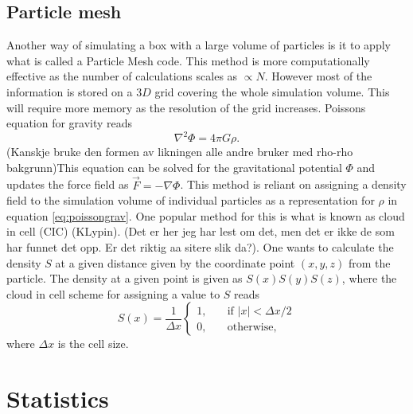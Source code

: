 \subsection{Particle mesh}
Another way of simulating a box with a large volume of particles is it to apply
what is called a Particle Mesh code. This method is more computationally
effective as the number of calculations scales as $\propto N$. However most of
the information is stored on a $3D$ grid covering the whole simulation volume.
This will require more memory as the resolution of the grid increases. Poissons equation for gravity reads
\begin{equation}\label{eq:poissongrav}
    \nabla^2\Phi=4\pi G\rho.
\end{equation}
(Kanskje bruke den formen av likningen alle andre bruker med rho-rho bakgrunn)This equation can be solved for the gravitational potential $\Phi$ and updates
the force field as $\vec{F}=-\nabla\Phi$. This method is reliant on assigning a
density field to the simulation volume of individual particles as a
representation for $\rho$ in equation \ref{eq:poissongrav}. One popular method 
for this is what is known as cloud in cell (CIC) (KLypin). (Det
er her jeg har lest om det, men det er ikke de som har funnet det opp. Er det
riktig aa sitere slik da?). One wants to calculate the density $S$ at a given
distance given by the coordinate point $(x,y,z)$ from the particle. The density at a given point is given as
$S(x)S(y)S(z)$, where the cloud in cell scheme for assigning a value to $S$
reads
\begin{equation}
    S(x)=\frac{1}{\Delta x}
    \begin{cases}
        1, &\quad\text{if }\vert x \vert < \Delta x/2\\
        0, &\quad\text{otherwise},
      \end{cases}
\end{equation}
where $\Delta x$ is the cell size.

\section{Statistics}
